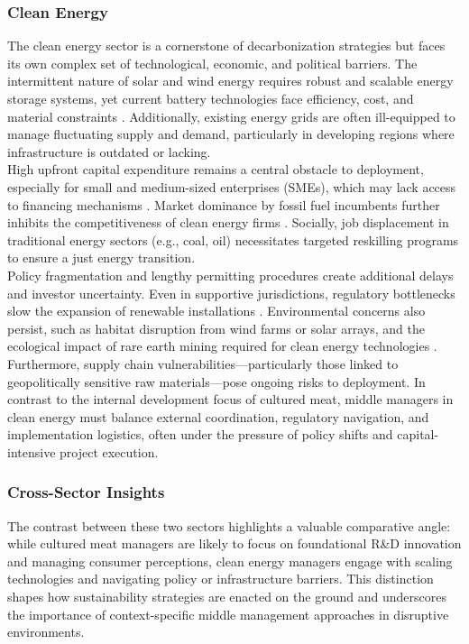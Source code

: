 	\subsubsection{Clean Energy}
	The clean energy sector is a cornerstone of decarbonization strategies but faces its own complex set of technological, economic, and political barriers. The intermittent nature of solar and wind energy requires robust and scalable energy storage systems, yet current battery technologies face efficiency, cost, and material constraints \cite{Zhang2016, IEA2021}. Additionally, existing energy grids are often ill-equipped to manage fluctuating supply and demand, particularly in developing regions where infrastructure is outdated or lacking. \\
	
	High upfront capital expenditure remains a central obstacle to deployment, especially for small and medium-sized enterprises (SMEs), which may lack access to financing mechanisms \cite{Mngumi2022}. Market dominance by fossil fuel incumbents further inhibits the competitiveness of clean energy firms \cite{IRENA2017}. Socially, job displacement in traditional energy sectors (e.g., coal, oil) necessitates targeted reskilling programs to ensure a just energy transition. \\
	
	Policy fragmentation and lengthy permitting procedures create additional delays and investor uncertainty. Even in supportive jurisdictions, regulatory bottlenecks slow the expansion of renewable installations \cite{Zhang2016}. Environmental concerns also persist, such as habitat disruption from wind farms or solar arrays, and the ecological impact of rare earth mining required for clean energy technologies \cite{IEA2021}. Furthermore, supply chain vulnerabilities—particularly those linked to geopolitically sensitive raw materials—pose ongoing risks to deployment. In contrast to the internal development focus of cultured meat, middle managers in clean energy must balance external coordination, regulatory navigation, and implementation logistics, often under the pressure of policy shifts and capital-intensive project execution. \\
	
	\subsubsection{Cross-Sector Insights}
	The contrast between these two sectors highlights a valuable comparative angle: while cultured meat managers are likely to focus on foundational R\&D innovation and managing consumer perceptions, clean energy managers engage with scaling technologies and navigating policy or infrastructure barriers. This distinction shapes how sustainability strategies are enacted on the ground and underscores the importance of context-specific middle management approaches in disruptive environments. \\
	

